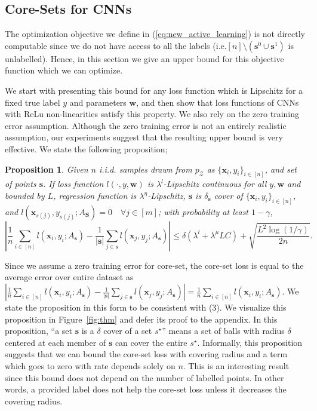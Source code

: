 \documentclass{article} %
\makeatletter
\newtheorem{theorem}{Proposition}
\newcommand*{\ie}{i.e.\@\xspace}
\makeatother
\begin{document}
\subsection{Core-Sets for CNNs} 
The optimization objective we define in (\ref{eq:new_active_learning}) is not directly computable since we do not have
access to all the labels (\ie $[n] \setminus (\mathbf{s}^0 \cup \mathbf{s}^1)$ is unlabelled). Hence, in this section we
give an upper bound for this objective function which we can optimize. 

We start with presenting this bound for any loss function which is Lipschitz for a fixed true label $y$ and parameters $\mathbf{w}$, and then show that loss functions of CNNs with ReLu non-linearities satisfy this property. We also rely on the zero training error assumption. Although the zero training error is not an entirely realistic assumption,  our experiments suggest that the resulting upper bound is very effective. We state the following proposition;
\begin{theorem} Given $n$ i.i.d. samples drawn from $p_\mathcal{Z}$ as $\{\mathbf{x}_i,y_i\}_{i\in[n]}$, and set of
    points $\mathbf{s}$. If loss function $l(\cdot,y,\mathbf{w})$ is $\lambda^l$-Lipschitz continuous
    for all $y, \mathbf{w}$ and bounded by $L$, regression function is $\lambda^\eta$-Lipschitz, $\mathbf{s}$
    is $\delta_\mathbf{s}$ cover of $\{\mathbf{x}_i,y_i\}_{i\in[n]}$, and
    $l(\mathbf{x}_{s(j)},y_{s(j)}; A_\mathbf{S})=0\quad \forall j \in [m]$; with probability at least $1-\gamma$,
    \[
    \left| \frac{1}{n}\sum_{i \in [n]} l(\mathbf{x}_i,y_i; A_{\mathbf{s}}) -
    \frac{1}{|\mathbf{s}|}\sum_{j \in \mathbf{s}} l(\mathbf{x}_j,y_j;A_{\mathbf{s}}) \right|  \leq \delta (\lambda^l + \lambda^\mu LC)+ \sqrt{\frac{L^2
    \log(1/\gamma)}{2n}}. \]
\label{mainthm2} \end{theorem}

Since we assume a zero training error for core-set, the core-set loss is equal to the average error over entire dataset as \mbox{$\left| \frac{1}{n}\sum_{i \in [n]} l(\mathbf{x}_i,y_i; A_{\mathbf{s}}) -
    \frac{1}{|\mathbf{s}|}\sum_{j \in \mathbf{s}} l(\mathbf{x}_j,y_j;A_{\mathbf{s}}) \right| = \frac{1}{n}\sum_{i \in [n]} l(\mathbf{x}_i,y_i; A_{\mathbf{s}})$}. We state the proposition in this form to be consistent with (3). We visualize this proposition in Figure~\ref{fig:thm} and defer its proof to the appendix. In this proposition, ``a set $\mathbf{s}$ is a $\delta$ cover of a set $s^\star$''  means a set of balls with radius
$\delta$ centered at each member of $\mathbf{s}$ can cover the entire $s^\star$. Informally, this proposition suggests that we can bound the core-set loss with covering radius and a term which goes to
zero with rate depends solely on $n$. This is an interesting result since this bound does not depend on the number of labelled points. In
other words, a provided label does not help the core-set loss unless it decreases the covering radius.
\end{document}
